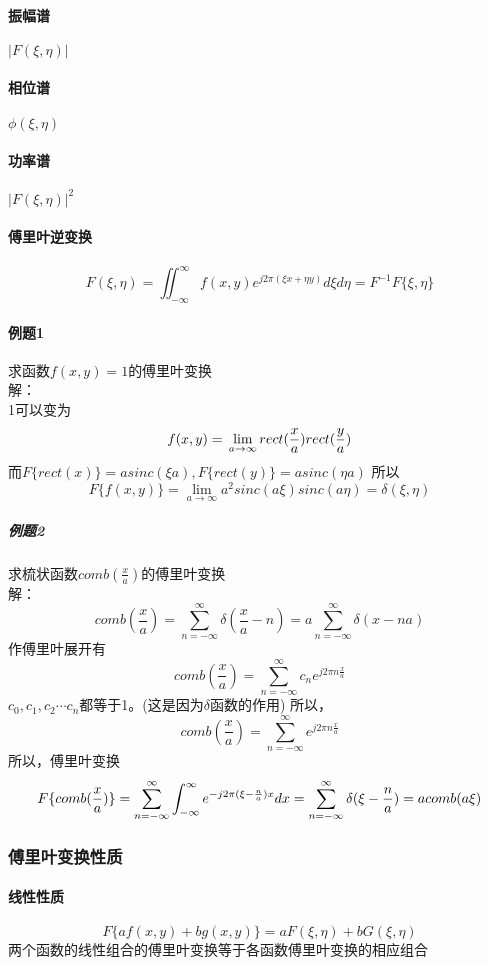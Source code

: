 \documentclass[UTF8]{ctexart}
\newcommand{\f}[2]{\frac{#1}{#2}}%
\newcommand{\sumsum}[3]{\sum_{#1=#2}^#3}
\begin{document}
\paragraph{振幅谱}$|F(\xi,\eta)|$
\paragraph{相位谱}$\phi(\xi,\eta)$
\paragraph{功率谱}$|F(\xi,\eta)|^2$
\paragraph{傅里叶逆变换}\[F(\xi,\eta)=\iint_{-\infty}^{\infty}f(x,y)e^{j2\pi(\xi x+\eta y)}d\xi d\eta=F^{-1} {F\{\xi,\eta\}}\]
\paragraph{例题1}求函数$f(x,y)=1$的傅里叶变换\\解：\\
1可以变为\[f(x,y)=\\
\lim\limits_{a \to \infty}rect(\f{x}{a})rect(\f{y}{a})\]
而$F\{rect(x)\}=asinc(\xi a),F\{rect(y)\}=asinc(\eta a)$
所以\[ F\{f(x,y)\}=\lim\limits_{a \to \infty}a^2sinc(a\xi)sinc(a\eta)=\delta(\xi,\eta)
\]
\subparagraph{例题2}求梳状函数$comb(\f{x}{a})$的傅里叶变换
\\解：\[comb(\f{x}{a})=\sumsum{n}{-\infty}{\infty}\delta(\f{x}{a}-n)=a\sumsum{n}{-\infty}{\infty}\delta(x-na)\]
作傅里叶展开有\[
   comb(\f{x}{a})=\sumsum{n}{-\infty}{\infty}c_{n}e^{j2\pi n\f{x}{a}} \]
$c_{0},c_{1},c_{2}\cdots c_{n}$都等于1。(这是因为$\delta$函数的作用)
所以，\[
    comb(\f{x}{a})=\sumsum{n}{-\infty}{\infty}e^{j2\pi n\f{x}{a}}\]
所以，傅里叶变换\[
    F\{comb(\f{x}{a})\}=\sumsum{n}{-\infty}{\infty}\int_{-\infty}^{\infty}e^{-j2\pi(\xi-\f{n}{a})x}dx \\
    =\sumsum{n}{-\infty}{\infty}\delta(\xi-\f{n}{a})=acomb(a\xi)
    \]
\subsubsection{傅里叶变换性质}%
\paragraph{线性性质}
\[
    F\{ af(x,y)+bg(x,y)\}=aF(\xi,\eta)+bG(\xi,\eta)
\]
两个函数的线性组合的傅里叶变换等于各函数傅里叶变换的相应组合
\end{document}
